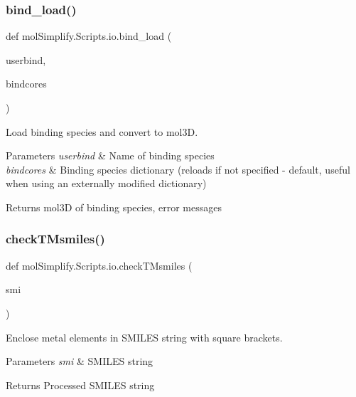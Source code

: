\subsubsection{\texorpdfstring{bind\+\_\+load()}{bind\_load()}}
{\footnotesize\ttfamily def mol\+Simplify.\+Scripts.\+io.\+bind\+\_\+load (\begin{DoxyParamCaption}\item[{}]{userbind,  }\item[{}]{bindcores }\end{DoxyParamCaption})}



Load binding species and convert to mol3D. 


\begin{DoxyParams}{Parameters}
{\em userbind} & Name of binding species \\
\hline
{\em bindcores} & Binding species dictionary (reloads if not specified -\/ default, useful when using an externally modified dictionary) \\
\hline
\end{DoxyParams}
\begin{DoxyReturn}{Returns}
mol3D of binding species, error messages 
\end{DoxyReturn}
\mbox{\label{namespacemolSimplify_1_1Scripts_1_1io_afea58c49aad8ec19954d2e01b9db0ee8}} 
\subsubsection{\texorpdfstring{check\+T\+Msmiles()}{checkTMsmiles()}}
{\footnotesize\ttfamily def mol\+Simplify.\+Scripts.\+io.\+check\+T\+Msmiles (\begin{DoxyParamCaption}\item[{}]{smi }\end{DoxyParamCaption})}



Enclose metal elements in S\+M\+I\+L\+ES string with square brackets. 


\begin{DoxyParams}{Parameters}
{\em smi} & S\+M\+I\+L\+ES string \\
\hline
\end{DoxyParams}
\begin{DoxyReturn}{Returns}
Processed S\+M\+I\+L\+ES string 
\end{DoxyReturn}
\mbox{\label{namespacemolSimplify_1_1Scripts_1_1io_ae7ce81f03a95bf70a0356d8075a4c9f3}} 
